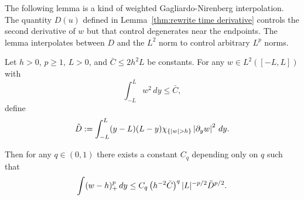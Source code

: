 The following lemma is a kind of weighted Gagliardo-Nirenberg interpolation.  The quantity $D(u)$ defined in Lemma~\ref{thm:rewrite time derivative} controls the second derivative of $w$ but that control degenerates near the endpoints.  The lemma interpolates between $D$ and the $L^2$ norm to control arbitrary $L^p$ norms.  

\begin{lemma} \label{thm:gagliardo}
Let $h > 0$, $p\geq 1$, $L > 0$, and $\bar{C} \leq 2 h^2 L$ be constants.  For any $w \in L^2([-L,L])$ with
\[ \int_{-L}^L w^2 \,dy \leq \bar{C}, \]
define
\[ \tilde{D} := \int_{-L}^L (y - L)(L-y) \indic{|w|>h} \abs{\del_y w}^2 \,dy. \]

Then for any $q \in (0,1)$ there exists a constant $C_q$ depending only on $q$ such that
\[ \int (w-h)_+^p \,dy \leq C_q \left( h^{-2} \bar{C} \right)^q |L|^{-p/2} \tilde{D}^{p/2}. \]
\end{lemma}

